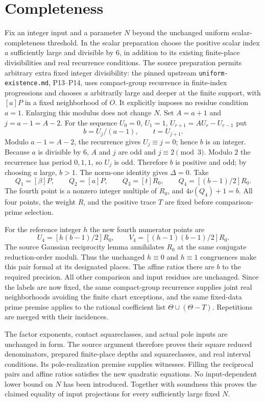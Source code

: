 \documentclass[11pt]{article}
\begin{document}
\section*{Completeness}
Fix an integer input and a parameter $N$ beyond the unchanged uniform
scalar-completeness threshold. In the scalar preparation choose the
positive scalar index $a$ sufficiently large and divisible by $6$, in
addition to its existing finite-place divisibilities and real recurrence
conditions. The source preparation permits arbitrary extra fixed
integer divisibility: the pinned upstream \texttt{uniform-existence.md},
P13--P14, uses compact-group recurrence in finite-index progressions and
chooses $a$ arbitrarily large and deeper at the finite support, with
$[a]P$ in a fixed neighborhood of $O$. It explicitly imposes no residue
condition $a=1$. Enlarging this modulus does not change $N$.
Set $A=a+1$ and $j=a-1=A-2$. For the sequence
$U_0=0$, $U_1=1$, $U_{r+1}=AU_r-U_{r-1}$ put
\[
                    b=U_j/(a-1),\qquad t=U_{j+1}.
\]
Modulo $a-1=A-2$, the recurrence gives $U_j\equiv j=0$; hence $b$ is
an integer. Because $a$ is divisible by $6$, $A$ and $j$ are odd and
$j\equiv2\pmod3$. Modulo $2$ the recurrence has period $0,1,1$,
so $U_j$ is odd. Therefore $b$ is positive and odd; by choosing $a$
large, $b>1$. The norm-one identity gives $\Delta=0$.
Take
\[
 Q_1=[\beta]P,\qquad Q_2=[a]P,\qquad Q_3=[t]R_0,
 \qquad Q_4=[(b-1)/2]R_0.
\]
The fourth point is a nonzero integer multiple of $R_0$, and
$4\nu(Q_4)+1=b$. All four points, the weight $R$, and the positive
trace $T$ are fixed before comparison-prime selection.

For the reference integer $h$ the new fourth numerator points are
\[
 U_4=[h(b-1)/2]R_0,\qquad V_4=[(h-1)(b-1)/2]R_0.
\]
The source Gaussian reciprocity lemma annihilates $R_0$ at the same
conjugate reduction-order moduli. Thus the unchanged $h\equiv0$ and
$h\equiv1$ congruences make this pair formal at its designated places.
The affine ratios there are $b$ to the required precision. All other
comparison and input residues are unchanged. Since the labels are now
fixed, the same compact-group recurrence supplies joint real neighborhoods
avoiding the finite chart exceptions, and the same fixed-data prime
premise applies to the rational coefficient list
$\Theta\cup(\Theta-T)$. Repetitions are merged with their incidences.

The factor exponents, contact squareclasses, and actual pole inputs are
unchanged in form. The source argument therefore proves their square
reduced denominators, prepared finite-place depths and squareclasses,
and real interval conditions. Its pole-realization premise supplies
witnesses. Filling the reciprocal pairs and affine ratios satisfies the
new quadratic equations. No input-dependent lower bound on $N$ has been
introduced. Together with soundness this proves the claimed equality of
input projections for every sufficiently large fixed $N$.
\end{document}
